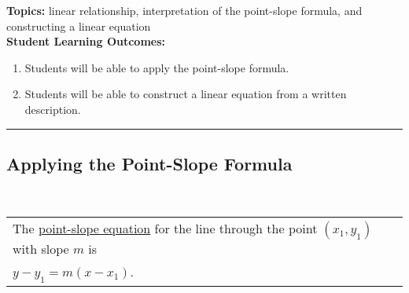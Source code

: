 


\noindent \textbf{Topics:}  linear relationship, interpretation of the point-slope formula, and constructing a linear equation\\

\noindent \textbf{Student Learning Outcomes:}
\begin{enumerate}
\item Students will be able to apply the point-slope formula.
\item Students will be able to construct a linear equation from a written description.

\end{enumerate}

\hrule 

\bigskip

\subsection{Applying the Point-Slope Formula} ~

\begin{tabular}{| l |}\hline
The \underline{point-slope equation} for the line through the point $(x_1,y_1)$ with slope $m$ is \\

 $y-y_1 = m(x-x_1)$. \\ \hline
\end{tabular} 

